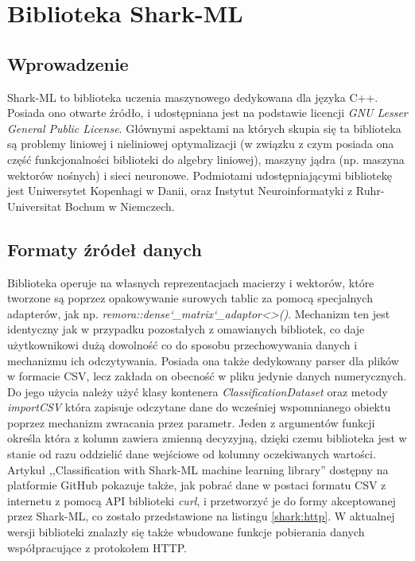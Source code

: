 \chapter{Biblioteka Shark-ML}

\section{Wprowadzenie}

Shark-ML to biblioteka uczenia maszynowego dedykowana dla języka C++. Posiada ono otwarte źródło, i udostępniana jest na podstawie licencji \textit{GNU Lesser General Public License}. Głównymi aspektami na których skupia się ta biblioteka są problemy liniowej i nieliniowej optymalizacji (w związku z czym posiada ona część funkcjonalności biblioteki do algebry liniowej), maszyny jądra (np. maszyna wektorów nośnych) i sieci neuronowe. \cite{shark} Podmiotami udostępniającymi bibliotekę jest Uniwersytet Kopenhagi w Danii, oraz Instytut Neuroinformatyki z Ruhr-Universitat Bochum w Niemczech.

\section{Formaty źródeł danych}

Biblioteka operuje na własnych reprezentacjach macierzy i wektorów, które tworzone są poprzez opakowywanie surowych tablic za pomocą specjalnych adapterów, jak np. \textit{remora::dense\char`_matrix\char`_adaptor<>()}. Mechanizm ten jest identyczny jak w przypadku pozostałych z omawianych bibliotek, co daje użytkownikowi dużą dowolność co do sposobu przechowywania danych i mechanizmu ich odczytywania. Posiada ona także dedykowany parser dla plików w formacie CSV, lecz zakłada on obecność w pliku jedynie danych numerycznych. Do jego użycia należy użyć klasy kontenera \textit{ClassificationDataset} oraz metody \textit{importCSV} która zapisuje odczytane dane do wcześniej wspomnianego obiektu poprzez mechanizm zwracania przez parametr. Jeden z argumentów funkcji określa która z kolumn zawiera zmienną decyzyjną, dzięki czemu biblioteka jest w stanie od razu oddzielić dane wejściowe od kolumny oczekiwanych wartości. Artykuł ,,Classification with Shark-ML machine learning library''\cite{shark:http} dostępny na platformie GitHub pokazuje także, jak pobrać dane w postaci formatu CSV z internetu z pomocą API biblioteki \textit{curl}, i przetworzyć je do formy akceptowanej przez Shark-ML, co zostało przedstawione na listingu \ref{shark:http}. W aktualnej wersji biblioteki znalazły się także wbudowane funkcje pobierania danych współpracujące z protokołem HTTP.


